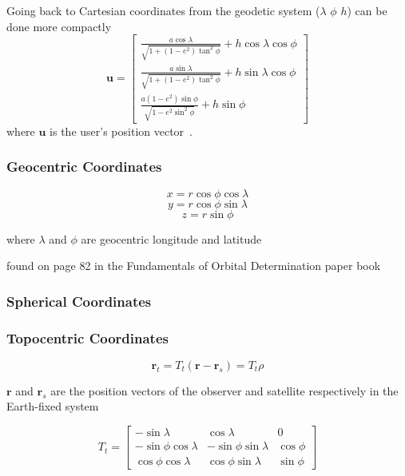 
Going back to Cartesian coordinates from the geodetic system ($\lambda$ $\phi$ $h$) can be done more compactly
\[ \mathbf{u} = \left[  \begin{array}{c}
\frac{a\cos\lambda}{\sqrt{1+(1-e^2)\tan^{2}\phi}}+h\cos\lambda\cos\phi \\
\frac{a\sin\lambda}{\sqrt{1+(1-e^2)\tan^{2}\phi}}+h\sin\lambda\cos\phi \\
\frac{a(1-e^{2})\sin\phi}{\sqrt{1-e^{2}\sin^{2}\phi}}+h\sin\phi
\end{array}
\right] \]
where $\mathbf{u}$ is the user's position vector~\cite[pp. 26-28, p. 76]{kaplan:ugpspa,me:gsmp}.

\subsubsection{Geocentric Coordinates}
\[x=r\cos\phi\cos\lambda\]
\[y=r\cos\phi\sin\lambda\]
\[z=r\sin\phi\]

where $\lambda$ and $\phi$ are geocentric longitude and latitude

found on page 82 in the Fundamentals of Orbital Determination paper book

\subsubsection{Spherical Coordinates}

\subsubsection{Topocentric Coordinates}
\[\mathbf{r}_{t}=T_{t}(\mathbf{r}-\mathbf{r}_{s})=T_{t}\rho\]

$\mathbf{r}$ and $\mathbf{r}_{s}$ are the position vectors of the observer and satellite respectively in the Earth-fixed system

\[T_{t}=\left[ \begin{array}{ccc}
-\sin\lambda & \cos\lambda & 0 \\
-\sin\phi\cos\lambda & -\sin\phi\sin\lambda & \cos\phi \\
\cos\phi\cos\lambda & \cos\phi\sin\lambda & \sin\phi \end{array} \right] \]

